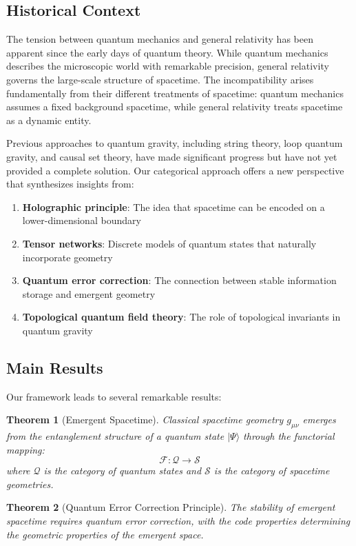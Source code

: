 \documentclass[12pt,a4paper]{article}
\newcommand{\cat}[1]{\mathcal{#1}}
\newcommand{\functor}{\mathcal{F}}
\theoremstyle{plain}
\newtheorem{theorem}{Theorem}[section]
\theoremstyle{definition}
\theoremstyle{remark}
\begin{document}
\subsection{Historical Context}

The tension between quantum mechanics and general relativity has been apparent since the early days of quantum theory. While quantum mechanics describes the microscopic world with remarkable precision, general relativity governs the large-scale structure of spacetime. The incompatibility arises fundamentally from their different treatments of spacetime: quantum mechanics assumes a fixed background spacetime, while general relativity treats spacetime as a dynamic entity.

Previous approaches to quantum gravity, including string theory, loop quantum gravity, and causal set theory, have made significant progress but have not yet provided a complete solution. Our categorical approach offers a new perspective that synthesizes insights from:

\begin{enumerate}
\item \textbf{Holographic principle}: The idea that spacetime can be encoded on a lower-dimensional boundary
\item \textbf{Tensor networks}: Discrete models of quantum states that naturally incorporate geometry
\item \textbf{Quantum error correction}: The connection between stable information storage and emergent geometry
\item \textbf{Topological quantum field theory}: The role of topological invariants in quantum gravity
\end{enumerate}

\subsection{Main Results}

Our framework leads to several remarkable results:

\begin{theorem}[Emergent Spacetime]
Classical spacetime geometry $g_{\mu\nu}$ emerges from the entanglement structure of a quantum state $|\Psi\rangle$ through the functorial mapping:
\[\functor: \cat{Q} \to \cat{S}\]
where $\cat{Q}$ is the category of quantum states and $\cat{S}$ is the category of spacetime geometries.
\end{theorem}

\begin{theorem}[Quantum Error Correction Principle]
The stability of emergent spacetime requires quantum error correction, with the code properties determining the geometric properties of the emergent space.
\end{theorem}
\end{document}
